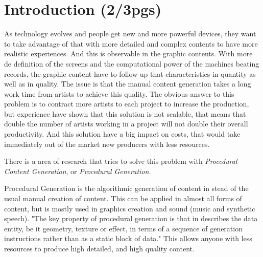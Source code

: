
% 
% 

\section{Introduction (2/3pgs)}



As technology evolves and people get new and more powerful devices, they want to take advantage of that with more detailed and complex contents to have more realistic experiences. 
And this is observable in the graphic contents. With more de definition of the screens and the computational power of the machines beating records, the graphic content have to follow up that characteristics in quantity as well as in quality. The issue is that the manual content generation takes a long work time from artists to achieve this quality.
The obvious answer to this problem is to contract more artists to each project to increase the production, but experience have shown that this solution is not scalable, that means that double the number of artists working in a project will not double their overall productivity. And this solution have a big impact on costs, that would take immediately out of the market new producers with less resources.

There is a area of research that tries to solve this problem with \emph{Procedural Content Generation}, or \emph{Procedural Generation}.

Procedural Generation is the algorithmic generation of content in stead of the usual manual creation of content. This can be applied in almost all forms of content, but is mostly used in graphics creation and sound (music and synthetic speech).
"The key property of procedural generation is that in describes the data entity, be it geometry, texture or effect, in terms of a sequence of generation instructions rather than as a static block of data."\cite{Kelly} This allows anyone with less resources to produce high detailed, and high quality content.


